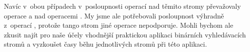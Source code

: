 Navíc v~obou případech v~posloupnosti operací nad těmito stromy převažovaly operace  a  nad operacemi . My jsme ale potřebovali posloupnost výhradně z~operací , protože tango strom jiné operace nepodporuje. Mohli bychom ale zkusit najít pro naše účely vhodnější praktickou aplikaci binárních vyhledávacích stromů a vyzkoušet časy běhu jednotlivých stromů při této aplikaci.
